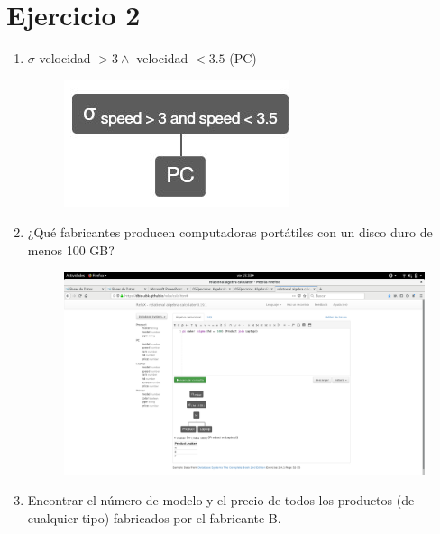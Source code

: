 \documentclass[a4paper, 12pt]{report}
\begin{document}
\section*{Ejercicio 2}{
\begin{enumerate}[label=\alph*)]

\item{$\sigma$ velocidad $> 3 \wedge$  velocidad  $<  3.5$ (PC)\\
    \begin{figure}[H]
        \includegraphics[width=\textwidth]
            {img/a.png}\hfill
    \end{figure}
}
\item{¿Qué fabricantes producen computadoras portátiles con un disco duro de
    menos 100 GB?\\
    \begin{figure}[H]
        \includegraphics[width=\textwidth]
            {img/b.png}\hfill
    \end{figure}
}
\item{Encontrar el número de modelo y el precio de todos los productos
	(de cualquier tipo) fabricados
	por el fabricante B.\\
}
\end{enumerate}}
\end{document}
